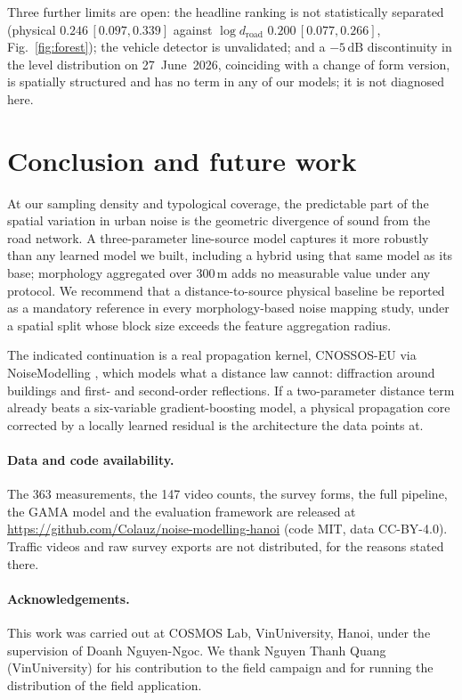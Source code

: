 \documentclass[10pt,twocolumn,a4paper]{article}
\newcommand{\dB}{\ensuremath{\,\mathrm{dB}}}
\begin{document}
Three further limits are open: the headline ranking is not statistically
separated (physical $0.246\,[0.097, 0.339]$ against $\log d_{\text{road}}$
$0.200\,[0.077, 0.266]$, Fig.~\ref{fig:forest}); the vehicle detector is
unvalidated; and a $-5$\dB{} discontinuity in the level distribution on
27~June~2026, coinciding with a change of form version, is spatially structured
and has no term in any of our models; it is not diagnosed here.

\section{Conclusion and future work}

At our sampling density and typological coverage, the predictable part of the
spatial variation in urban noise is the geometric divergence of sound from the
road network. A three-parameter line-source model captures it more robustly than
any learned model we built, including a hybrid using that same model as its base;
morphology aggregated over 300\,m adds no measurable value under any protocol.
We recommend that a distance-to-source physical baseline be reported as a
mandatory reference in every morphology-based noise mapping study, under a
spatial split whose block size exceeds the feature aggregation radius.

The indicated continuation is a real propagation kernel, CNOSSOS-EU via
NoiseModelling \citep{kephalopoulos2014cnossos, bocher2019noisemodelling}, which models what a distance law cannot: diffraction around buildings and
first- and second-order reflections. If a two-parameter distance term already
beats a six-variable gradient-boosting model, a physical propagation core
corrected by a locally learned residual is the architecture the data points at.

\paragraph{Data and code availability.} The 363 measurements, the 147 video
counts, the survey forms, the full pipeline, the GAMA model and the evaluation
framework are released at
\url{https://github.com/Colauz/noise-modelling-hanoi} (code MIT, data CC-BY-4.0).
Traffic videos and raw survey exports are not distributed, for the reasons stated
there.

\paragraph{Acknowledgements.} This work was carried out at COSMOS Lab,
VinUniversity, Hanoi, under the supervision of Doanh Nguyen-Ngoc. We thank
Nguyen Thanh Quang (VinUniversity) for his contribution to the field campaign
and for running the distribution of the field application.

\scriptsize
\setlength{\bibsep}{2pt plus 1pt}


\end{document}

